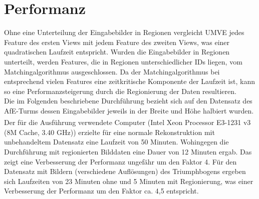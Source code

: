 \section{Performanz}
Ohne eine Unterteilung der Eingabebilder in Regionen vergleicht UMVE jedes Feature des ersten Views mit jedem Feature des zweiten Views, was einer quadratischen Laufzeit entspricht. Wurden die Eingabebilder in Regionen unterteilt, werden Features, die in Regionen unterschiedlicher IDs liegen, vom Matchingalgorithmus ausgeschlossen. Da der Matchingalgorithmus bei entsprechend vielen Features eine zeitkritische Komponente der Laufzeit ist, kann so eine Performanzsteigerung durch die Regionierung der Daten resultieren.\\
Die im Folgenden beschriebene Durchf\"uhrung bezieht sich auf den Datensatz des AfE-Turms dessen Eingabebilder jeweils in der Breite und H\"ohe halbiert wurden. Der f\"ur die Ausf\"uhrung verwendete Computer (Intel\textsuperscript{\textregistered} Xeon\textsuperscript{\textregistered} Processor E3-1231 v3
(8M Cache, 3.40 GHz)) erzielte f\"ur eine normale Rekonstruktion mit unbehandeltem Datensatz eine Laufzeit von 50 Minuten. Wohingegen die Durchf\"uhrung mit regionierten Bilddaten eine Dauer von 12 Minuten ergab. Das zeigt eine Verbesserung der Performanz ungef\"ahr um den Faktor 4. F\"ur den Datensatz mit Bildern (verschiedene Aufl\"osungen) des Triumphbogens ergeben sich Laufzeiten von 23 Minuten ohne und 5 Minuten mit Regionierung, was einer Verbesserung der Performanz um den Faktor ca. 4,5 entspricht.